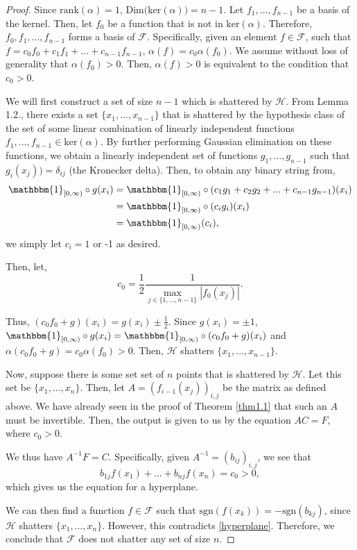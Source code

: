 \documentclass{article}
\begin{document}
\begin{proof}

Since $\text{rank}(\alpha)=1$, $\text{Dim(ker}(\alpha)\text{)}=n-1$. Let $f_1,...,f_{n-1}$ be a basis of the kernel. Then, let $f_0$ be a function that is not in $\text{ker}(\alpha)$. Therefore, $f_0,f_1,...,f_{n-1}$ forms a basis of $\mathcal{F}$. Specifically, given an element $f\in\mathcal{F}$, such that $f= c_0f_0 + c_1 f_1 +... +c_{n-1}f_{n-1}$, $\alpha(f)=c_0\alpha(f_0)$. We assume without loss of generality that $\alpha(f_0)>0$. Then, $\alpha(f)>0$ is equivalent to the condition that $c_0>0$.

We will first construct a set of size $n-1$ which is shattered by $\mathcal{H}$. From Lemma 1.2., there exists a set $\{x_1,...,x_{n-1}\}$ that is shattered by the hypothesis class of the set of some linear combination of linearly independent functions $f_1,...,f_{n-1}\in \text{ker}(\alpha)$. By further performing Gaussian elimination on these functions, we obtain a linearly independent set of functions $g_1,...,g_{n-1}$ such that $g_i(x_j))=\delta_{ij}$ (the Kronecker delta). Then, to obtain any binary string from,
\begin{align*}
\mathbbm{1}_{[0,\infty)}\circ g(x_i)&=\mathbbm{1}_{[0,\infty)} \circ (c_1g_1+c_2g_2+...+c_{n-1}g_{n-1})(x_i)\\&=\mathbbm{1}_{[0,\infty)} \circ (c_ig_i)(x_i) \\ &= \mathbbm{1}_{[0,\infty)}(c_i),
\end{align*}
we simply let $c_i=1$ or -1 as desired.

Then, let,
$$c_0 = \frac{1}{2}\frac{1}{\max_{j\in\{1,...,n-1\}}|f_0(x_j)|}.$$

Thus, $(c_0f_0+g)(x_i)= g(x_i)\pm \frac{1}{2}$. Since $g(x_i)=\pm1$,\\ 
$\mathbbm{1}_{[0,\infty)}\circ g(x_i) = \mathbbm{1}_{[0,\infty)}\circ (c_0f_0+g)(x_i)$ and $ \alpha(c_0 f_0 + g) = c_0\alpha(f_0) > 0$. 
Then, $\mathcal{H}$ shatters $\{x_1,...,x_{n-1}\}$.

Now, suppose there is some set set of $n$ points that is shattered by $\mathcal{H}$. Let this set be $\{x_1,...,x_n\}$. Then, let $A=(f_{i-1}(x_j))_{i,j}$ be the matrix as defined above. We have already seen in the proof of Theorem \ref{thm1.1} that such an $A$ must be invertible. Then, the output is given to us by the equation $AC=F$, where $c_0>0$.

We thus have $A^{-1}F = C$. Specifically, given $A^{-1}=(b_{ij})_{i,j}$, we see that
\begin{equation}\label{hyperplane}
    b_{1j}f(x_1)+...+b_{nj}f(x_n)=c_0>0,
\end{equation}
which gives us the equation for a hyperplane.

We can then find a function $f\in\mathcal{F}$ such that $\text{sgn}(f(x_k))=-\text{sgn}(b_{kj})$, since $\mathcal{H}$ shatters $\{x_1,...,x_n\}$. However, this contradicts \eqref{hyperplane}. Therefore, we conclude that $\mathcal{F}$ does not shatter any set of size $n$.
\end{proof}
\end{document}
